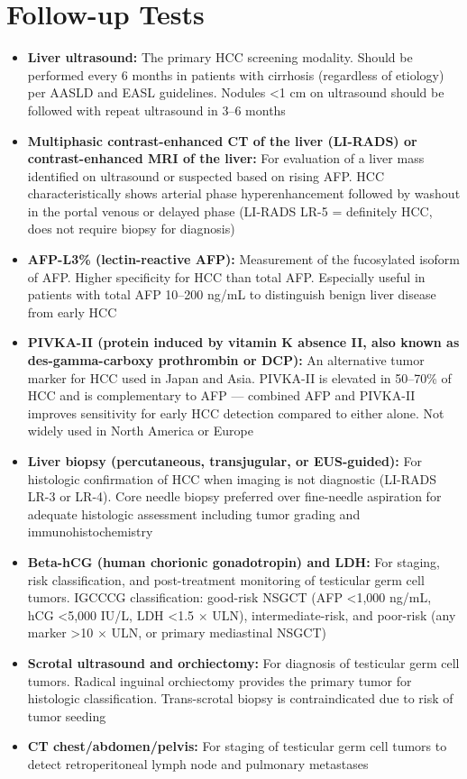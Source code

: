 \section*{Follow-up Tests}
\begin{itemize}
  \item \textbf{Liver ultrasound:} The primary HCC screening modality. Should be performed every 6 months in patients with cirrhosis (regardless of etiology) per AASLD and EASL guidelines. Nodules <1 cm on ultrasound should be followed with repeat ultrasound in 3--6 months
  \item \textbf{Multiphasic contrast-enhanced CT of the liver (LI-RADS) or contrast-enhanced MRI of the liver:} For evaluation of a liver mass identified on ultrasound or suspected based on rising AFP. HCC characteristically shows arterial phase hyperenhancement followed by washout in the portal venous or delayed phase (LI-RADS LR-5 = definitely HCC, does not require biopsy for diagnosis)
  \item \textbf{AFP-L3\% (lectin-reactive AFP):} Measurement of the fucosylated isoform of AFP. Higher specificity for HCC than total AFP. Especially useful in patients with total AFP 10--200 ng/mL to distinguish benign liver disease from early HCC
  \item \textbf{PIVKA-II (protein induced by vitamin K absence II, also known as des-gamma-carboxy prothrombin or DCP):} An alternative tumor marker for HCC used in Japan and Asia. PIVKA-II is elevated in 50--70\% of HCC and is complementary to AFP --- combined AFP and PIVKA-II improves sensitivity for early HCC detection compared to either alone. Not widely used in North America or Europe
  \item \textbf{Liver biopsy (percutaneous, transjugular, or EUS-guided):} For histologic confirmation of HCC when imaging is not diagnostic (LI-RADS LR-3 or LR-4). Core needle biopsy preferred over fine-needle aspiration for adequate histologic assessment including tumor grading and immunohistochemistry
  \item \textbf{Beta-hCG (human chorionic gonadotropin) and LDH:} For staging, risk classification, and post-treatment monitoring of testicular germ cell tumors. IGCCCG classification: good-risk NSGCT (AFP <1,000 ng/mL, hCG <5,000 IU/L, LDH <1.5 $\times$ ULN), intermediate-risk, and poor-risk (any marker >10 $\times$ ULN, or primary mediastinal NSGCT)
  \item \textbf{Scrotal ultrasound and orchiectomy:} For diagnosis of testicular germ cell tumors. Radical inguinal orchiectomy provides the primary tumor for histologic classification. Trans-scrotal biopsy is contraindicated due to risk of tumor seeding
  \item \textbf{CT chest/abdomen/pelvis:} For staging of testicular germ cell tumors to detect retroperitoneal lymph node and pulmonary metastases
\end{itemize}

